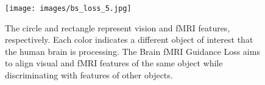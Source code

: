 \begin{figure}[!t]
    \centering
    \texttt{[image: images/bs\_loss\_5.jpg]}
    \vspace{-6mm}
    \caption{The circle and rectangle represent vision and fMRI features, respectively. Each color indicates a different object of interest that the human brain is processing. The Brain fMRI Guidance Loss aims to align visual and fMRI features of the same object while discriminating with features of other objects.}
    \label{fig:bs_loss}
\end{figure}
